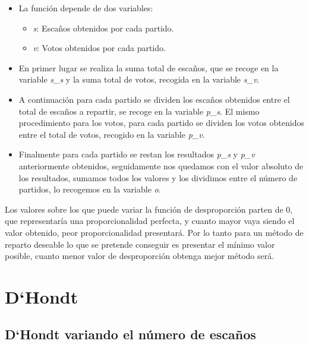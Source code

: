 \documentclass[12pt,a4paper,]{book}
\providecommand{\tightlist}{%
  \setlength{\itemsep}{0pt}\setlength{\parskip}{0pt}}
\numberwithin{dummy}{section}
\theoremstyle{ocrenumbox}
\theoremstyle{blacknumex}
\theoremstyle{blacknumbox}
\theoremstyle{ocrenum}
\theoremstyle{ocrenum}
\begin{document}
\begin{itemize}
\tightlist
\item
  La función depende de dos variables:

  \begin{itemize}
  \tightlist
  \item
    \emph{s}: Escaños obtenidos por cada partido.
  \item
    \emph{v}: Votos obtenidos por cada partido.
  \end{itemize}
\item
  En primer lugar se realiza la suma total de escaños, que se recoge en
  la variable \emph{s\_s} y la suma total de votos, recogida en la
  variable \emph{s\_v}.
\item
  A continuación para cada partido se dividen los escaños obtenidos
  entre el total de escaños a repartir, se recoge en la variable
  \emph{p\_s}. El mismo procedimiento para los votos, para cada partido
  se dividen los votos obtenidos entre el total de votos, recogido en la
  variable \emph{p\_v}.
\item
  Finalmente para cada partido se restan los resultados \emph{p\_s} y
  \emph{p\_v} anteriormente obtenidos, seguidamente nos quedamos con el
  valor absoluto de los resultados, sumamos todos los valores y los
  dividimos entre el número de partidos, lo recogemos en la variable
  \emph{o}.
\end{itemize}

Los valores sobre los que puede variar la función de desproporción
parten de 0, que representaría una proporcionalidad perfecta, y cuanto
mayor vaya siendo el valor obtenido, peor proporcionalidad presentará.
Por lo tanto para un método de reparto deseable lo que se pretende
conseguir es presentar el mínimo valor posible, cuanto menor valor de
desproporción obtenga mejor método será.

\hypertarget{dhondt}{%
\section{D`Hondt}\label{dhondt}}

\hypertarget{dhondt-variando-el-nuxfamero-de-escauxf1os}{%
\subsection{D`Hondt variando el número de
escaños}\label{dhondt-variando-el-nuxfamero-de-escauxf1os}}
\end{document}
